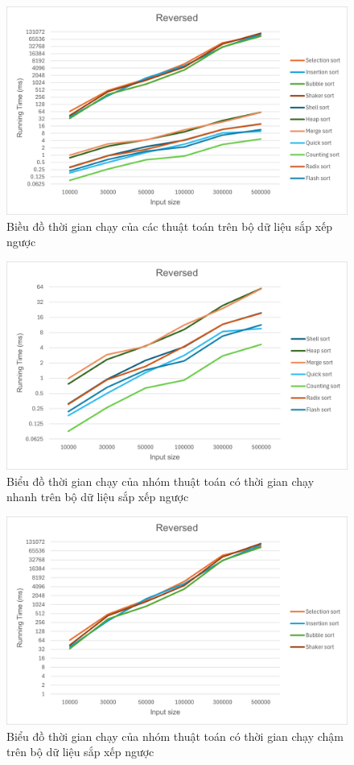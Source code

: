     \begin{figure}[H] 
        \centering
        \includegraphics[width = 0.9\linewidth]{img/experiment/running time/reversed/1.png}
        \caption{Biều đồ thời gian chạy của các thuật toán trên bộ dữ liệu sắp xếp ngược}
    \end{figure}

    \begin{figure}[H]
        \centering
        \includegraphics[width = 0.9\linewidth]{img/experiment/running time/reversed/2.png}
        \caption{Biểu đồ thời gian chạy của nhóm thuật toán có thời gian chạy nhanh trên bộ dữ liệu sắp xếp ngược}
    \end{figure}

    \begin{figure}[H]
        \centering
        \includegraphics[width = 0.9\linewidth]{img/experiment/running time/reversed/3.png}
        \caption{Biểu đồ thời gian chạy của nhóm thuật toán có thời gian chạy chậm trên bộ dữ liệu sắp xếp ngược}
    \end{figure}

